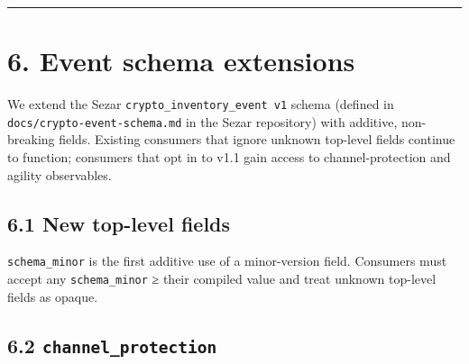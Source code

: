 \begin{center}\rule{0.5\linewidth}{0.5pt}\end{center}

\section{6. Event schema extensions}\label{event-schema-extensions}

We extend the Sezar \texttt{crypto\_inventory\_event\ v1} schema
(defined in \texttt{docs/crypto-event-schema.md} in the Sezar
repository) with additive, non-breaking fields. Existing consumers that
ignore unknown top-level fields continue to function; consumers that opt
in to v1.1 gain access to channel-protection and agility observables.

\subsection{6.1 New top-level fields}\label{new-top-level-fields}

\begin{Shaded}
\begin{Highlighting}[]
\FunctionTok{\{}
  \FunctionTok{:} \FunctionTok{,}
  \FunctionTok{:} \FunctionTok{,}
  \FunctionTok{:} \FunctionTok{,}
  \FunctionTok{:} \FunctionTok{,}
  \FunctionTok{:} \FunctionTok{\{}  \FunctionTok{\},}
  \FunctionTok{:} \OtherTok{[}  \OtherTok{]}\FunctionTok{,}
  \FunctionTok{:} \FunctionTok{\{}  \FunctionTok{\},}   \ErrorTok{//}   
  \FunctionTok{:} \FunctionTok{\{}  \FunctionTok{\},}              \ErrorTok{//}   
  \FunctionTok{:} \FunctionTok{\{}  \FunctionTok{\}}
\FunctionTok{\}}
\end{Highlighting}
\end{Shaded}

\texttt{schema\_minor} is the first additive use of a minor-version
field. Consumers must accept any \texttt{schema\_minor} ≥ their compiled
value and treat unknown top-level fields as opaque.

\subsection{\texorpdfstring{6.2
\texttt{channel\_protection}}{6.2 channel\_protection}}\label{channel_protection}

